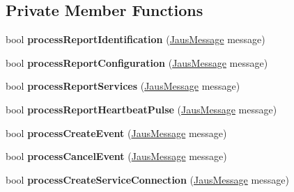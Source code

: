 \subsection*{\-Private \-Member \-Functions}
\begin{DoxyCompactItemize}
\item 
\hypertarget{class_communicator_component_a209ab16bbd6fc1c0729ef12d73a49f7b}{bool {\bfseries process\-Report\-Identification} (\hyperlink{struct_jaus_message_struct}{\-Jaus\-Message} message)}\label{class_communicator_component_a209ab16bbd6fc1c0729ef12d73a49f7b}

\item 
\hypertarget{class_communicator_component_adeca9b795fa08b80e48a932a898b6192}{bool {\bfseries process\-Report\-Configuration} (\hyperlink{struct_jaus_message_struct}{\-Jaus\-Message} message)}\label{class_communicator_component_adeca9b795fa08b80e48a932a898b6192}

\item 
\hypertarget{class_communicator_component_aabc3f7341e3d6efd3beb4b2630273cc6}{bool {\bfseries process\-Report\-Services} (\hyperlink{struct_jaus_message_struct}{\-Jaus\-Message} message)}\label{class_communicator_component_aabc3f7341e3d6efd3beb4b2630273cc6}

\item 
\hypertarget{class_communicator_component_af751252c640235a0f9a3235a684bc264}{bool {\bfseries process\-Report\-Heartbeat\-Pulse} (\hyperlink{struct_jaus_message_struct}{\-Jaus\-Message} message)}\label{class_communicator_component_af751252c640235a0f9a3235a684bc264}

\item 
\hypertarget{class_communicator_component_a794bf31a5f53232acf21f0f1aeb0317a}{bool {\bfseries process\-Create\-Event} (\hyperlink{struct_jaus_message_struct}{\-Jaus\-Message} message)}\label{class_communicator_component_a794bf31a5f53232acf21f0f1aeb0317a}

\item 
\hypertarget{class_communicator_component_aba83d9ef42a545be758a1c9dcf7b7dad}{bool {\bfseries process\-Cancel\-Event} (\hyperlink{struct_jaus_message_struct}{\-Jaus\-Message} message)}\label{class_communicator_component_aba83d9ef42a545be758a1c9dcf7b7dad}

\item 
\hypertarget{class_communicator_component_a2d41516d64e3c9922bd97f4b082e22ba}{bool {\bfseries process\-Create\-Service\-Connection} (\hyperlink{struct_jaus_message_struct}{\-Jaus\-Message} message)}\label{class_communicator_component_a2d41516d64e3c9922bd97f4b082e22ba}


\end{DoxyCompactItemize}
